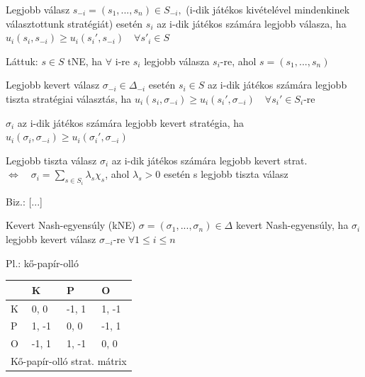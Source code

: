 	\begin{definition}{Legjobb válasz}{}
		$s_{-i} = (s_1, ..., s_n) \in S_{-i},$ (i-dik játékos kivételével mindenkinek választottunk stratégiát) esetén $s_i$ az i-dik játékos számára legjobb válasza, ha $u_i(s_i,s_{-i}) \geq u_i(s_i',s_{-i}) \quad \forall s'_i \in S$
	\end{definition}
	
	Láttuk: $s \in S$ tNE, ha $\forall$ i-re $s_i$ legjobb válasza $s_i$-re, ahol $s = (s_1, ..., s_n)$
	
	\begin{definition}{Legjobb kevert válasz}{}
		$\sigma_{-i} \in \Delta_{-i}$ esetén $s_i \in S$ az i-dik játékos számára legjobb tiszta stratégiai választás, ha $u_i(s_i, \sigma_{-i}) \geq u_i(s_i',\sigma_{-i}) \quad \forall s_i' \in S_i$-re
	\end{definition}
	
	$\sigma_i$ az i-dik játékos számára legjobb kevert stratégia, ha $u_i(\sigma_i, \sigma_{-i}) \geq u_i(\sigma_i', \sigma_{-i})$
	
	\begin{observation}{Legjobb tiszta válasz}{}
		$\sigma_i$ az i-dik játékos számára legjobb kevert strat. $\Leftrightarrow \quad \sigma_i = \sum_{s \in S_i} \lambda_s \chi_s$, ahol $\lambda_s > 0$ esetén s legjobb tiszta válasz
	\end{observation}
	
	Biz.: [...]
	
	\begin{definition}{Kevert Nash-egyensúly (kNE)}{}
		$\sigma = (\sigma_1, ..., \sigma_n) \in \Delta$ kevert Nash-egyensúly, ha $\sigma_i$ legjobb kevert válasz $\sigma_{-i}$-re $\forall 1\leq i \leq n$
	\end{definition}
	
	Pl.: kő-papír-olló
	\begin{center}
		\begin{tabular}{llll}
			\hline
			\multicolumn{1}{|l|}{}  & \multicolumn{1}{l|}{K}     & \multicolumn{1}{l|}{P}     & \multicolumn{1}{l|}{O}     \\ \hline
			\multicolumn{1}{|l|}{K} & \multicolumn{1}{l|}{0, 0}  & \multicolumn{1}{l|}{-1, 1} & \multicolumn{1}{l|}{1, -1} \\ \hline
			\multicolumn{1}{|l|}{P} & \multicolumn{1}{l|}{1, -1} & \multicolumn{1}{l|}{0, 0}  & \multicolumn{1}{l|}{-1, 1} \\ \hline
			\multicolumn{1}{|l|}{O} & \multicolumn{1}{l|}{-1, 1} & \multicolumn{1}{l|}{1, -1} & \multicolumn{1}{l|}{0, 0}  \\ \hline
			\multicolumn{4}{l}{Kő-papír-olló strat. mátrix}                                                               
		\end{tabular}
	\end{center}
	
